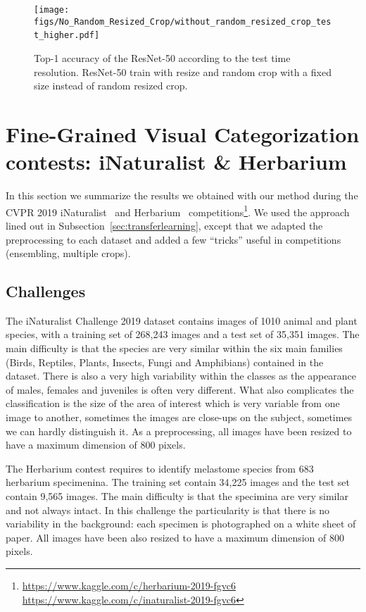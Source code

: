 \documentclass{article}
\begin{document}
\begin{figure}[t]
\begin{center}
\texttt{[image: figs/No\_Random\_Resized\_Crop/without\_random\_resized\_crop\_test\_higher.pdf]}~\end{center}
\caption{\label{fig:norandomresizedcrop}
Top-1 accuracy of the ResNet-50 according to the test time resolution. ResNet-50 train with resize and random crop with a fixed size instead of random resized crop.
}
\end{figure}

\section{Fine-Grained Visual Categorization contests: iNaturalist \& Herbarium}
\label{sec:challenges}

In this section we summarize the results we obtained with our method during the CVPR 2019 iNaturalist~\cite{Horn2017INaturalist} and Herbarium~\cite{Kiat2019Herbarium} competitions\footnote{
\url{https://www.kaggle.com/c/herbarium-2019-fgvc6} \newline
\url{https://www.kaggle.com/c/inaturalist-2019-fgvc6}}.
We used the approach lined out in Subsection~\ref{sec:transferlearning}, except that we adapted the preprocessing to each dataset and added a few ``tricks'' useful in competitions (ensembling, multiple crops). 

\subsection{Challenges}

The iNaturalist Challenge 2019 dataset contains images of 1010 animal and plant species, with a training set of 268,243 images and a test set of 35,351 images. 
The main difficulty is that the species are very similar within the six main families (Birds, Reptiles, Plants, Insects, Fungi and Amphibians) contained in the dataset. 
There is also a very high variability within the classes as the appearance of males, females and juveniles is often very different.
What also complicates the classification is the size of the area of interest which is very variable from one image to another, sometimes the images are close-ups on the subject, sometimes we can hardly distinguish it. 
As a preprocessing, all images have been resized to have a maximum dimension of 800 pixels.

The Herbarium contest requires to identify melastome species from 683 herbarium specimenina.
The training set contain 34,225 images and the test set contain 9,565 images. 
The main difficulty is that the specimina are very similar and not always intact. 
In this challenge the particularity is that there is no variability in the background: each specimen is photographed on a white sheet of paper. All images have been also resized to have a maximum dimension of 800 pixels.
\end{document}
